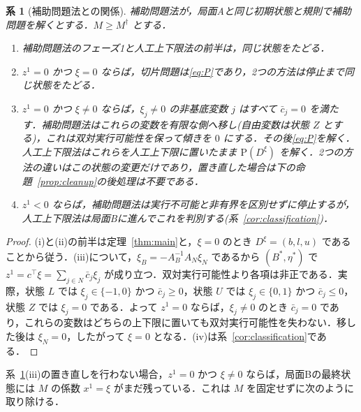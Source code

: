 \documentclass[11pt,a4paper]{ltjsarticle}
\theoremstyle{plain}
\newtheorem{corollary}[theorem]{系}
\theoremstyle{definition}
\theoremstyle{remark}
\newcommand{\Pb}{\mathrm{P}}
\begin{document}
\begin{corollary}[補助問題法との関係]
\label{cor:subproblem}
補助問題法が，局面Aと同じ初期状態と規則で補助問題を解くとする．$M\ge M^\dagger$ とする．
\begin{enumerate}[label=(\roman*)]
\item 補助問題法のフェーズ1と人工上下限法の前半は，同じ状態をたどる．
\item $z^1=0$ かつ $\xi=0$ ならば，切片問題は\eqref{eq:P}であり，2つの方法は停止まで同じ状態をたどる．
\item $z^1=0$ かつ $\xi\neq0$ ならば，$\xi_j\neq0$ の非基底変数 $j$ はすべて $\bar c_j=0$ を満たす．補助問題法はこれらの変数を有限な側へ移し(自由変数は状態 $Z$ とする)，これは双対実行可能性を保って傾きを $0$ にする．その後\eqref{eq:P}を解く．人工上下限法はこれらを人工上下限に置いたまま $\Pb(D^\xi)$ を解く．2つの方法の違いはこの状態の変更だけであり，置き直した場合は下の命題~\ref{prop:cleanup}の後処理は不要である．
\item $z^1<0$ ならば，補助問題法は実行不可能と非有界を区別せずに停止するが，人工上下限法は局面Bに進んでこれを判別する(系~\ref{cor:classification})．
\end{enumerate}
\end{corollary}
\begin{proof}
(i)と(ii)の前半は定理~\ref{thm:main}と，$\xi=0$ のとき $D^\xi=(b,l,u)$ であることから従う．(iii)について，$\xi_B=-A_B^{-1}A_N\xi_N$ であるから $(B^\ast,\eta^\ast)$ で $z^1=c^\top\xi=\sum_{j\in N}\bar c_j\xi_j$ が成り立つ．双対実行可能性より各項は非正である．実際，状態 $L$ では $\xi_j\in\{-1,0\}$ かつ $\bar c_j\ge0$，状態 $U$ では $\xi_j\in\{0,1\}$ かつ $\bar c_j\le0$，状態 $Z$ では $\xi_j=0$ である．よって $z^1=0$ ならば，$\xi_j\neq0$ のとき $\bar c_j=0$ であり，これらの変数はどちらの上下限に置いても双対実行可能性を失わない．移した後は $\xi_N=0$，したがって $\xi=0$ となる．(iv)は系~\ref{cor:classification}である．
\end{proof}

系~\ref{cor:subproblem}(iii)の置き直しを行わない場合，$z^1=0$ かつ $\xi\neq0$ ならば，局面Bの最終状態には $M$ の係数 $x^1=\xi$ がまだ残っている．これは $M$ を固定せずに次のように取り除ける．
\end{document}
